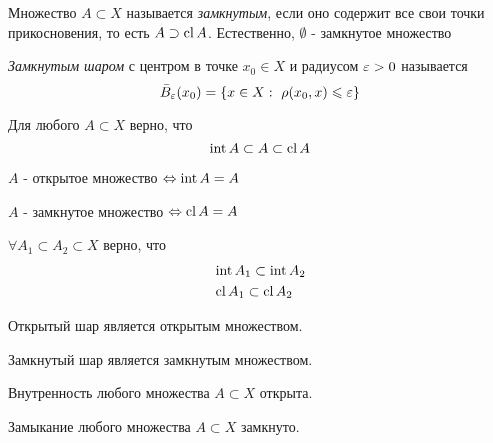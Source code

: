 \begin{multicols}{2}
    \begin{definition}{}{}
        Множество $A \subset X$ называется \textit{замкнутым}, если оно содержит все свои точки прикосновения, то есть $A \supset \operatorname{cl} A$. Естественно, $\emptyset$ - замкнутое множество
    \end{definition}
    
    \begin{definition}{}{}
        \textit{Замкнутым шаром} с центром в точке $x_0 \in X$ и радиусом $\varepsilon > 0$ называется
        \[
            \bar{B}_\varepsilon(x_0) = \{x \in X : \  \rho(x_0, x) \leqslant \varepsilon\}
        \] 
    \end{definition}
    
    \begin{lemma}{}{}
        Для любого $A \subset X$ верно, что
        \[
            \operatorname{int} A \subset A \subset \operatorname{cl} A
        \]
    \end{lemma}
    
   
    
    \cons
        $A$ - открытое множество $\Leftrightarrow \operatorname{int} A = A$
        
        $A$ - замкнутое множество $\Leftrightarrow \operatorname{cl} A = A$ 
    
    
    \begin{lemma}{}{}
        $\forall A_1 \subset A_2 \subset X$ верно, что
        \begin{align*}
            &\operatorname{int} A_1 \subset \operatorname{int} A_2
            \\
            &\operatorname{cl} A_1 \subset \operatorname{cl} A_2
        \end{align*}
    \end{lemma}
       
    \begin{lemma}{}{}
        Открытый шар является открытым множеством.
    \end{lemma}
    
 
    \begin{lemma}{}{}
        Замкнутый шар является замкнутым множеством.
    \end{lemma}

    \begin{theorema}{}{}
        \begin{enumerate*}
            \item Внутренность любого множества $A \subset X$ открыта.
            
            \item Замыкание любого множества $A \subset X$ замкнуто.
        \end{enumerate*}
    \end{theorema}
    

\end{multicols}
